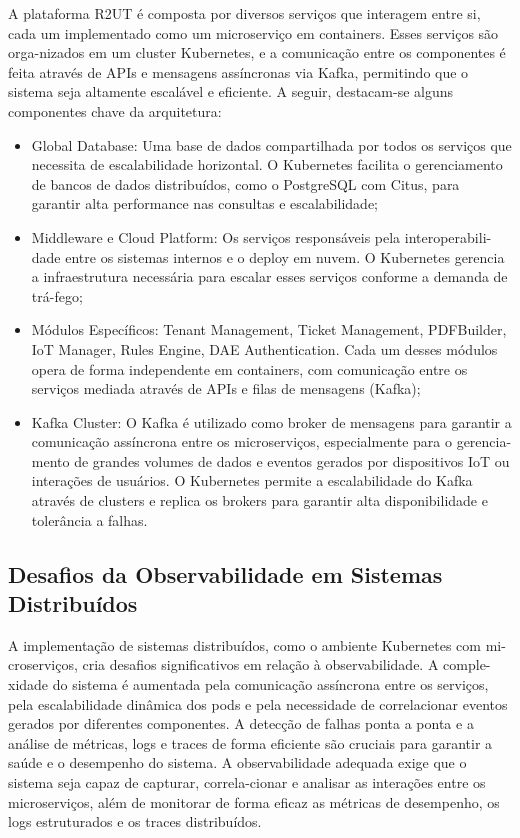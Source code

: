 A plataforma R2UT é composta por diversos serviços que interagem entre si, cada um implementado como um microserviço em containers. Esses serviços são orga-nizados em um cluster Kubernetes, e a comunicação entre os componentes é feita através de APIs e mensagens assíncronas via Kafka, permitindo que o sistema seja altamente escalável e eficiente. A seguir, destacam-se alguns componentes chave da arquitetura:

\begin{itemize}
    \item Global Database: Uma base de dados compartilhada por todos os serviços que necessita de escalabilidade horizontal. O Kubernetes facilita o gerenciamento de bancos de dados distribuídos, como o PostgreSQL com Citus, para garantir alta performance nas consultas e escalabilidade;
    \item Middleware e Cloud Platform: Os serviços responsáveis pela interoperabili-dade entre os sistemas internos e o deploy em nuvem. O Kubernetes gerencia a infraestrutura necessária para escalar esses serviços conforme a demanda de trá-fego;
    \item Módulos Específicos: Tenant Management, Ticket Management, PDFBuilder, IoT Manager, Rules Engine, DAE Authentication. Cada um desses módulos opera de forma independente em containers, com comunicação entre os serviços mediada através de APIs e filas de mensagens (Kafka);
    \item Kafka Cluster: O Kafka é utilizado como broker de mensagens para garantir a comunicação assíncrona entre os microserviços, especialmente para o gerencia-mento de grandes volumes de dados e eventos gerados por dispositivos IoT ou interações de usuários. O Kubernetes permite a escalabilidade do Kafka através de clusters e replica os brokers para garantir alta disponibilidade e tolerância a falhas.
\end{itemize}

\subsection{Desafios da Observabilidade em Sistemas Distribuídos}

A implementação de sistemas distribuídos, como o ambiente Kubernetes com mi-croserviços, cria desafios significativos em relação à observabilidade. A comple-xidade do sistema é aumentada pela comunicação assíncrona entre os serviços, pela escalabilidade dinâmica dos pods e pela necessidade de correlacionar eventos gerados por diferentes componentes. A detecção de falhas ponta a ponta e a análise de métricas, logs e traces de forma eficiente são cruciais para garantir a saúde e o desempenho do sistema.
A observabilidade adequada exige que o sistema seja capaz de capturar, correla-cionar e analisar as interações entre os microserviços, além de monitorar de forma eficaz as métricas de desempenho, os logs estruturados e os traces distribuídos.



